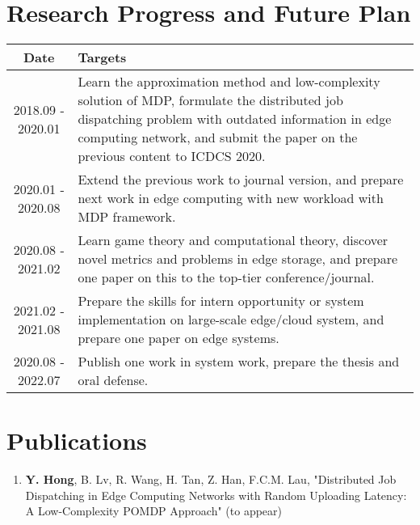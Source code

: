 \section{Research Progress and Future Plan}

\begin{center}
    \begin{tabularx}{0.90\linewidth}{ |c|X| }
        \hline  \textbf{Date}      & \textbf{Targets} \\
        \hline  {2018.09 - 2020.01}  & 
                {Learn the approximation method and low-complexity solution of MDP, formulate the distributed job dispatching problem with outdated information in edge computing network, and submit the paper on the previous content to ICDCS 2020.} \\
        \hline  {2020.01 - 2020.08}  & 
                {Extend the previous work to journal version, and prepare next work in edge computing with new workload with MDP framework.} \\
        \hline  {2020.08 - 2021.02}  & 
                {Learn game theory and computational theory, discover novel metrics and problems in edge storage, and prepare one paper on this to the top-tier conference/journal.} \\
        \hline  {2021.02 - 2021.08}  & 
                {Prepare the skills for intern opportunity or system implementation on large-scale edge/cloud system, and prepare one paper on edge systems.} \\
        \hline  {2020.08 - 2022.07}  & 
                {Publish one work in system work, prepare the thesis and oral defense.} \\
        \hline
    \end{tabularx}
\end{center}

\section{Publications}
\begin{enumerate}
    \item \textbf{Y. Hong}, {B. Lv}, {R. Wang}, {H. Tan}, {Z. Han}, {F.C.M. Lau}, "Distributed Job Dispatching in Edge Computing Networks with Random Uploading Latency: A Low-Complexity POMDP Approach" (to appear)
\end{enumerate}